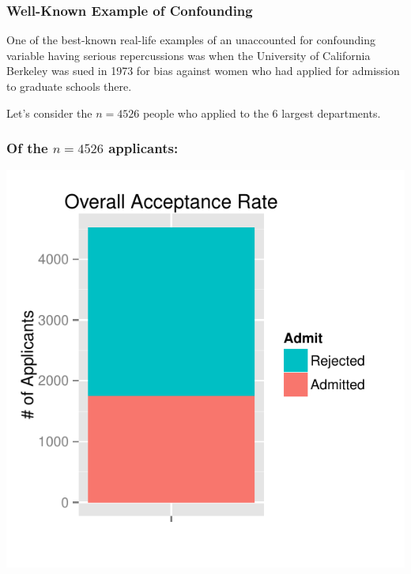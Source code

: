 \documentclass[handout]{beamer}
\begin{document}
\begin{frame}
\frametitle{Well-Known Example of Confounding}

One of the best-known real-life examples of an unaccounted for confounding variable having serious repercussions was when the University of California Berkeley was sued in 1973 for bias against women who had applied for admission to graduate schools there. 

\vskip 0.5cm

\pause Let's consider the $n=4526$ people who applied to the 6 largest departments.

\end{frame}



\begin{frame}
\frametitle{Of the $n=4526$ applicants:}

\begin{center}
\includegraphics[height=\textheight]{figure/overall.pdf}
\end{center}

\end{frame}
\end{document}
